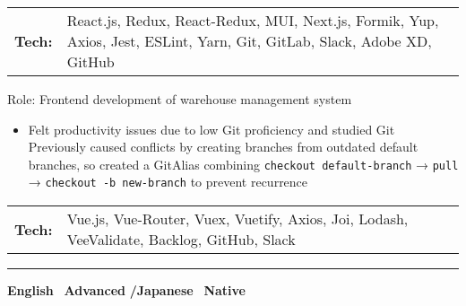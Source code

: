 \documentclass{article}
\begin{document}
\noindent
\begin{tabular}{@{}l l}
\textbf{Tech:} & \parbox[t]{\dimexpr\linewidth-6em\relax}{
  React.js, Redux, React-Redux, MUI, Next.js, Formik, Yup, Axios, Jest, ESLint, Yarn, Git, GitLab, Slack, Adobe XD, GitHub
}
\end{tabular}

\vspace{0.5em}

\noindent Role: Frontend development of warehouse management system

\begin{itemize}[leftmargin=1em]

  \item Felt productivity issues due to low Git proficiency and studied Git\\
  Previously caused conflicts by creating branches from outdated default branches, so created a GitAlias combining \texttt{checkout default-branch} → \texttt{pull} → \texttt{checkout -b new-branch} to prevent recurrence

\end{itemize}

\noindent
\begin{tabular}{@{}l l}
\textbf{Tech:} & \parbox[t]{\dimexpr\linewidth-6em\relax}{
  Vue.js, Vue-Router, Vuex, Vuetify, Axios, Joi, Lodash, VeeValidate, Backlog, GitHub, Slack
}
\end{tabular}

\vspace{0.25em}
\noindent\rule{\linewidth}{0.4pt}
\vspace{0.25em}

\noindent
\textbf{\large English} \textbar\
\textbf{Advanced}
\textbf{\large /Japanese} \textbar\
\textbf{Native}
\end{document}
